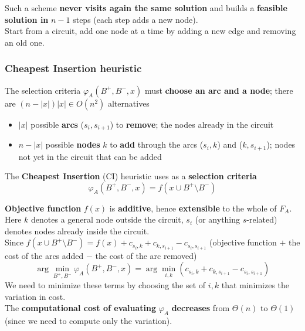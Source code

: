 Such a scheme \textbf{never visits again the same solution} and builds a \textbf{feasible solution in} $n - 1$ steps (each step adds a new node).\\

Start from a circuit, add one node at a time by adding a new edge and removing an old one.\\

\newpage

\subsubsection{Cheapest Insertion heuristic} 
The selection criteria $\varphi_A (B^+, B^-, x)$ must \textbf{choose an arc and a node}; there are $(n − |x|) |x| \in O (n^2)$ alternatives
\begin{itemize}
	\item $|x|$ possible \textbf{arcs} ($s_i , s_{i+1}$) to \textbf{remove}; the nodes already in the circuit
	\item $n − |x|$ possible \textbf{nodes} $k$ to \textbf{add} through the arcs ($s_i , k$) and ($k, s_{i+1}$); nodes not yet in the circuit that can be added
\end{itemize}

The \textbf{Cheapest Insertion} (CI) heuristic uses as a \textbf{selection criteria}
$$ \varphi_A (B^+, B^-, x) = f \left(x \cup B^+ \setminus B^- \right) $$

\textbf{Objective function} $f (x)$ is \textbf{additive}, hence \textbf{extensible} to the whole of $F_A$.\\

Here $k$ denotes a general node outside the circuit, $s_i$ (or anything $s$-related) denotes nodes already inside the circuit.\\

Since $f (x \cup B^+ \setminus B^-) = f (x) + c_{s_i ,k} + c_{k,s_{i+1}} - c_{s_i ,s_{i+1}}$ (objective function $+$ the cost of the arcs added $-$ the cost of the arc removed)
$$ \arg \min_{B^+, B^-} \varphi_A \left(B^+, B^-, x \right) = \arg \min_{i,k} (c_{s_i, k} + c_{k, s_{i+1}} - c_{s_i, s_{i+1}})$$
We need to minimize these terms by choosing the set of $i,k$ that minimizes the variation in cost. \\

The \textbf{computational cost of evaluating} $\varphi_A$ \textbf{decreases} from $\Theta (n)$ to $\Theta (1)$ (since we need to compute only the variation).\\

